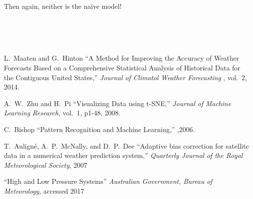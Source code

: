\documentclass[a4paper]{article}
\begin{document}
Then again, neither is the naive model!
\\
\qquad
\\
\qquad
\\
\qquad

\\
\qquad










\begin{thebibliography}{9}
  L.\ Maaten and G.\ Hinton
  ``A Method for Improving the Accuracy of Weather Forecasts Based on a Comprehensive Statistical Analysis of Historical Data for the Contiguous United States,''
  \textit{ Journal of Climatol Weather Forecasting }, vol.~2, 2014.

  A.\ W.\ Zhu and H.\ Pi
  ``Visualizing Data using t-SNE,''
  \textit{Journal of Machine Learning Research}, vol.~1, p1-48, 2008.

  C.\ Bishop
  ``Pattern Recognition and Machine Learning,'' ,2006.

  T.\ Auligné, A.\ P.\ McNally, and D.\ P.\ Dee
  ``Adaptive bias correction for satellite data in a numerical weather prediction system,''
  \textit{Quarterly Journal of the Royal Meteorological Society}, 2007

  ``High and Low Pressure Systems''
  \textit{Australian Government, Bureau of Meteorology}, accessed 2017

\end{thebibliography}
\end{document}
